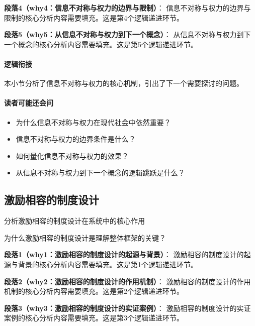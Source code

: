 \documentclass[../main.tex]{subfiles}
\begin{document}
\textbf{段落4（why4：信息不对称与权力的边界与限制）}：
信息不对称与权力的边界与限制的核心分析内容需要填充。这是第4个逻辑递进环节。


\textbf{段落5（why5：从信息不对称与权力到下一个概念）}：
从信息不对称与权力到下一个概念的核心分析内容需要填充。这是第5个逻辑递进环节。


\paragraph*{逻辑衔接}
本小节分析了信息不对称与权力的核心机制，引出了下一个需要探讨的问题。

\paragraph*{读者可能还会问}
\begin{itemize}
\item 为什么信息不对称与权力在现代社会中依然重要？
\item 信息不对称与权力的边界条件是什么？
\item 如何量化信息不对称与权力的效果？
\item 从信息不对称与权力到下一个概念的逻辑跳跃是什么？
\end{itemize}


\subsection{激励相容的制度设计}

\begin{motivation}
分析激励相容的制度设计在系统中的核心作用
\end{motivation}

\begin{logicmap}
[逻辑链占位]
\end{logicmap}

\begin{questionbox}
为什么激励相容的制度设计是理解整体框架的关键？
\end{questionbox}

\textbf{段落1（why1：激励相容的制度设计的起源与背景）}：
激励相容的制度设计的起源与背景的核心分析内容需要填充。这是第1个逻辑递进环节。


\textbf{段落2（why2：激励相容的制度设计的作用机制）}：
激励相容的制度设计的作用机制的核心分析内容需要填充。这是第2个逻辑递进环节。


\textbf{段落3（why3：激励相容的制度设计的实证案例）}：
激励相容的制度设计的实证案例的核心分析内容需要填充。这是第3个逻辑递进环节。
\end{document}
